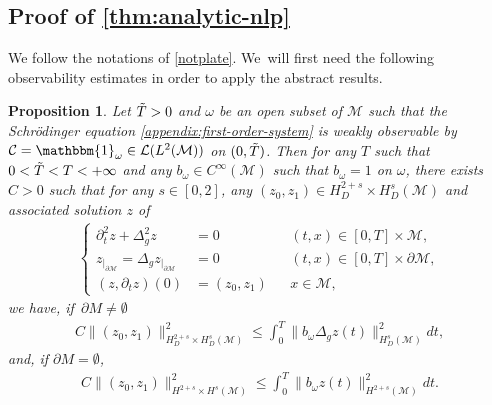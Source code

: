 \documentclass[JEP,XML,SOM,Unicode,published]{cedram}
\newtheorem{proposition}[theorem]{Proposition}
\theoremstyle{definition}
\let\mc\mathcal
\newcommand{\M}{\mc{M}}
\providecommand{\norm}[1]{\lVert#1\rVert}
\begin{document}
\subsection{Proof of \cref{thm:analytic-nlp}}
We follow the notations of \cref{notplate}. We~will first need the following observability estimates in order to apply the abstract results.
\begin{proposition}\label{prop:obs-plate}
Let $\Tilde{T}>0$ and $\omega$ be an open subset of $\M$ such that the Schrödinger equation
\eqref{appendix:first-order-system} is weakly observable by $\mc{C}=\mathbbm{1}_{\omega}\in \mc{L}( L^2(\M))$ on $(0, \Tilde{T})$. Then for any $T$ such that $0<\Tilde{T}<T<+\infty$ and any $b_{\omega}\in C^{\infty}(\M)$ such that $b_{\omega}=1$ on $\omega$, there exists $C>0$ such that for any $s\in [0,2]$, any $(z_0, z_1)\in H_D^{2+s}\times H^s_D(\M)$ and associated solution $z$ of
\begin{align*}
\left\{\begin{aligned}
\partial_t^2 z+\Delta_g^2 z&=0 &&(t, x)\in [0, T]\times \M,\\
z_{|_{\partial\M}}=\Delta_g z_{|_{\partial\M}}&=0 &&(t, x)\in [0, T]\times\partial\M,\\
(z, \partial_t z)(0)&=(z_0, z_1) &&x\in \M,
\end{aligned}\right.
\end{align*}
we have, if~$\partial M\neq \emptyset$
\begin{align}\label{thm:ineq:obs-plate-1}
C\norm{(z_0, z_1)}_{H^{2+s}_D\times H^s_D(\M)}^2\leq \int_0^T \norm{b_\omega \Delta_g z(t)}_{H^s_D(\M)}^2 dt,
\end{align}
and, if $\partial M= \emptyset$,
\begin{align}\label{thm:ineq:obs-plate-1bis}
C\norm{(z_0, z_1)}_{H^{2+s}\times H^s(\M)}^2\leq \int_0^T \norm{b_\omega z(t)}_{H^{2+s}(\M)}^2 dt.
\end{align}
\end{proposition}
\end{document}
